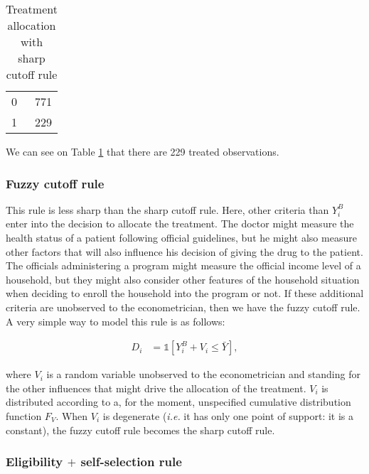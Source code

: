 \documentclass[]{book}
\newcommand{\uns}[1]{\mathds{1}[ #1 ]}
\theoremstyle{definition}
\theoremstyle{definition}
\theoremstyle{definition}
\theoremstyle{remark}
\begin{document}
\begin{table}[t]

\caption{\label{tab:tableDsharp}Treatment allocation with sharp cutoff rule}
\centering
\begin{tabular}{lr}
\toprule
0 & 771\\
1 & 229\\
\bottomrule
\end{tabular}
\end{table}

We can see on Table \ref{tab:tableDsharp} that there are 229 treated
observations.

\subsubsection{Fuzzy cutoff rule}\label{fuzzy-cutoff-rule}

This rule is less sharp than the sharp cutoff rule. Here, other criteria
than \(Y_i^B\) enter into the decision to allocate the treatment. The
doctor might measure the health status of a patient following official
guidelines, but he might also measure other factors that will also
influence his decision of giving the drug to the patient. The officials
administering a program might measure the official income level of a
household, but they might also consider other features of the household
situation when deciding to enroll the household into the program or not.
If these additional criteria are unobserved to the econometrician, then
we have the fuzzy cutoff rule. A very simple way to model this rule is
as follows:

\begin{align}\label{eq:fuzzcutoff}
  D_i & = \uns{Y_i^B+V_i\leq\bar{Y}},
\end{align}

where \(V_i\) is a random variable unobserved to the econometrician and
standing for the other influences that might drive the allocation of the
treatment. \(V_i\) is distributed according to a, for the moment,
unspecified cumulative distribution function \(F_V\). When \(V_i\) is
degenerate (\textit{i.e.} it has only one point of support: it is a
constant), the fuzzy cutoff rule becomes the sharp cutoff rule.

\subsubsection{\texorpdfstring{Eligibility \(+\) self-selection
rule}{Eligibility + self-selection rule}}\label{eligibility-self-selection-rule}
\end{document}
